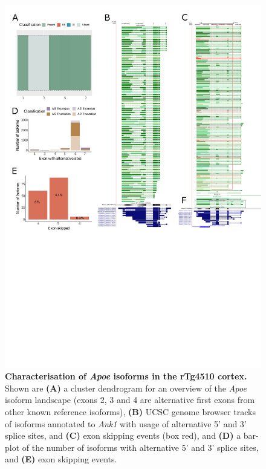 \begin{figure}[htp]
	\centering
	\includegraphics[page=1,trim={0cm 11cm 0 0},scale = 0.85]{Figures/TargetGenes_Annotation_Portrait.pdf}
	\captionsetup{width=0.95\textwidth}
	\caption[Characterisation of the \textit{Apoe} isoform landscape]%
	{\textbf{Characterisation of \textit{Apoe} isoforms in the rTg4510 cortex.} Shown are \textbf{(A)} a cluster dendrogram for an overview of the \textit{Apoe} isoform landscape (exons 2, 3 and 4 are alternative first exons from other known reference isoforms), \textbf{(B)} UCSC genome browser tracks of isoforms annotated to \textit{Ank1} with usage of alternative 5' and 3' splice sites, and \textbf{(C)} exon skipping events (box red), and \textbf{(D)} a bar-plot of the number of isoforms with alternative 5' and 3' splice sites, and \textbf{(E)} exon skipping events.}    
	\label{fig:apoe}
\end{figure}

